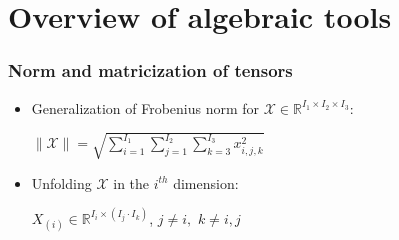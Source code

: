 \documentclass{beamer}
\begin{document}
\section{Overview of algebraic tools} %


\begin{frame}
\frametitle{Norm and matricization of tensors}
\begin{itemize}
\item Generalization of Frobenius norm for $\mathcal{X}\in \mathbb{R}^{I_1\times I_2 \times I_3}$:\\ \begin{center} $\| \mathcal{X} \|=\sqrt{\sum\limits_{i=1}^{I_1}\sum\limits_{j=1}^{I_2}\sum\limits_{k=3}^{I_3}x_{i,j,k}^2}$\end{center}\item Unfolding $ \mathcal{X}$ in the $i^{th}$ dimension:\\ \begin{center} $X_{(i)}\in \mathbb{R}^{I_i\times (I_j\cdot I_k)}$, $j\neq i,$ $k\neq i,j$  \end{center}
\begin{center}

\end{center}
\end{itemize}
\end{frame}
\end{document}
